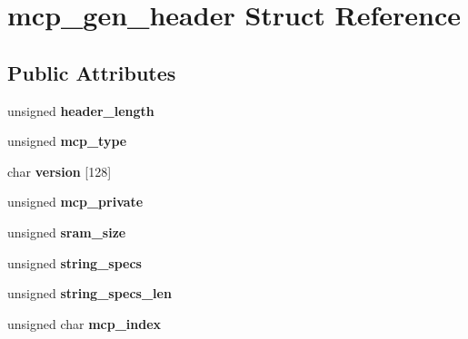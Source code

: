 \hypertarget{structmcp__gen__header}{
\section{mcp\_\-gen\_\-header Struct Reference}
\label{structmcp__gen__header}
}
\subsection*{Public Attributes}
\begin{DoxyCompactItemize}
\item 
\hypertarget{structmcp__gen__header_ad86150d841e159a32bed0718f0dbd274}{
unsigned {\bfseries header\_\-length}}
\label{structmcp__gen__header_ad86150d841e159a32bed0718f0dbd274}

\item 
\hypertarget{structmcp__gen__header_af150265342af3aa1c0dbfbfe951bf67e}{
unsigned {\bfseries mcp\_\-type}}
\label{structmcp__gen__header_af150265342af3aa1c0dbfbfe951bf67e}

\item 
\hypertarget{structmcp__gen__header_ae39514b81d50db08a491e90b941b10cb}{
char {\bfseries version} \mbox{[}128\mbox{]}}
\label{structmcp__gen__header_ae39514b81d50db08a491e90b941b10cb}

\item 
\hypertarget{structmcp__gen__header_a6faeff5a47074a6836dd0de64f60f7ca}{
unsigned {\bfseries mcp\_\-private}}
\label{structmcp__gen__header_a6faeff5a47074a6836dd0de64f60f7ca}

\item 
\hypertarget{structmcp__gen__header_a129bea0f50273177bd65766f06f7912f}{
unsigned {\bfseries sram\_\-size}}
\label{structmcp__gen__header_a129bea0f50273177bd65766f06f7912f}

\item 
\hypertarget{structmcp__gen__header_a00b290c289b9385dc854dc7461dbdda9}{
unsigned {\bfseries string\_\-specs}}
\label{structmcp__gen__header_a00b290c289b9385dc854dc7461dbdda9}

\item 
\hypertarget{structmcp__gen__header_af36dd2560bc5f739c909c2e53a084d7c}{
unsigned {\bfseries string\_\-specs\_\-len}}
\label{structmcp__gen__header_af36dd2560bc5f739c909c2e53a084d7c}

\item 
\hypertarget{structmcp__gen__header_a016fe8342b71b78341a32b73cd8ab3e5}{
unsigned char {\bfseries mcp\_\-index}}
\label{structmcp__gen__header_a016fe8342b71b78341a32b73cd8ab3e5}


\end{DoxyCompactItemize}
